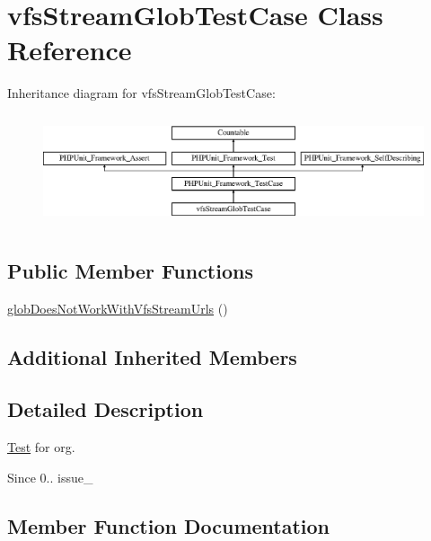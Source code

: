 \hypertarget{classorg_1_1bovigo_1_1vfs_1_1vfs_stream_glob_test_case}{}\section{vfs\+Stream\+Glob\+Test\+Case Class Reference}
\label{classorg_1_1bovigo_1_1vfs_1_1vfs_stream_glob_test_case}
Inheritance diagram for vfs\+Stream\+Glob\+Test\+Case\+:\begin{figure}[H]
\begin{center}
\leavevmode
\includegraphics[height=3.303835cm]{classorg_1_1bovigo_1_1vfs_1_1vfs_stream_glob_test_case}
\end{center}
\end{figure}
\subsection*{Public Member Functions}
\begin{DoxyCompactItemize}
\item 
\mbox{\hyperlink{classorg_1_1bovigo_1_1vfs_1_1vfs_stream_glob_test_case_a8a5bee2ceb22812b3173878babecda4a}{glob\+Does\+Not\+Work\+With\+Vfs\+Stream\+Urls}} ()
\end{DoxyCompactItemize}
\subsection*{Additional Inherited Members}


\subsection{Detailed Description}
\mbox{\hyperlink{class_test}{Test}} for org.

\begin{DoxySince}{Since}
0..  issue\+\_ 
\end{DoxySince}


\subsection{Member Function Documentation}
\mbox{\label{classorg_1_1bovigo_1_1vfs_1_1vfs_stream_glob_test_case_a8a5bee2ceb22812b3173878babecda4a}} 
